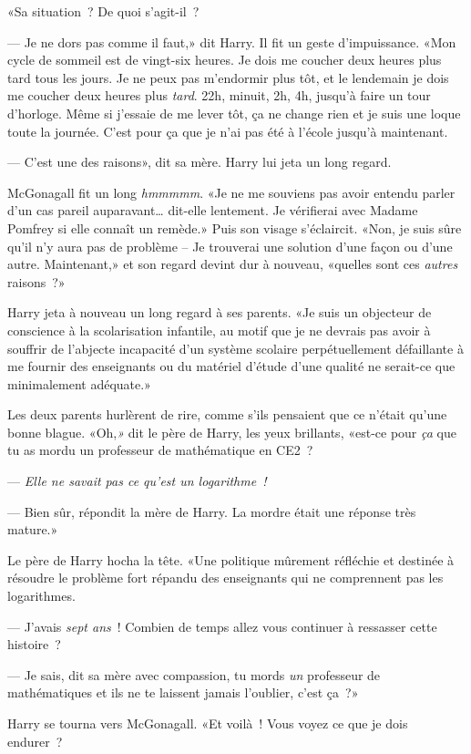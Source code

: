 «Sa situation~? De quoi s'agit-il~?

--- Je ne dors pas comme il faut,» dit Harry. Il fit un geste d'impuissance. «Mon cycle de sommeil est de vingt-six heures. Je dois me coucher deux heures plus tard tous les jours. Je ne peux pas m'endormir plus tôt, et le lendemain je dois me coucher deux heures plus \emph{tard}. 22h, minuit, 2h, 4h, jusqu'à faire un tour d'horloge. Même si j'essaie de me lever tôt, ça ne change rien et je suis une loque toute la journée. C'est pour ça que je n'ai pas été à l'école jusqu'à maintenant.

--- C'est une des raisons», dit sa mère. Harry lui jeta un long regard.

McGonagall fit un long \emph{hmmmmm}. «Je ne me souviens pas avoir entendu parler d'un cas pareil auparavant… dit-elle lentement. Je vérifierai avec Madame Pomfrey si elle connaît un remède.» Puis son visage s'éclaircit. «Non, je suis sûre qu'il n'y aura pas de problème -- Je trouverai une solution d'une façon ou d'une autre. Maintenant,» et son regard devint dur à nouveau, «quelles sont ces \emph{autres} raisons~?»

Harry jeta à nouveau un long regard à ses parents. «Je suis un objecteur de conscience à la scolarisation infantile, au motif que je ne devrais pas avoir à souffrir de l'abjecte incapacité d'un système scolaire perpétuellement défaillante à me fournir des enseignants ou du matériel d'étude d'une qualité ne serait-ce que minimalement adéquate.»

Les deux parents hurlèrent de rire, comme s'ils pensaient que ce n'était qu'une bonne blague. «Oh,\emph{»} dit le père de Harry, les yeux brillants, «est-ce pour \emph{ça} que tu as mordu un professeur de mathématique en CE2~?

--- \emph{Elle ne savait pas ce qu'est un logarithme~!}

--- Bien sûr, répondit la mère de Harry. La mordre était une réponse très mature.»

Le père de Harry hocha la tête. «Une politique mûrement réfléchie et destinée à résoudre le problème fort répandu des enseignants qui ne comprennent pas les logarithmes.

--- J'avais \emph{sept ans}~! Combien de temps allez vous continuer à ressasser cette histoire~?

--- Je sais, dit sa mère avec compassion, tu mords \emph{un} professeur de mathématiques et ils ne te laissent jamais l'oublier, c'est ça~?»

Harry se tourna vers McGonagall. «Et voilà~! Vous voyez ce que je dois endurer~?

